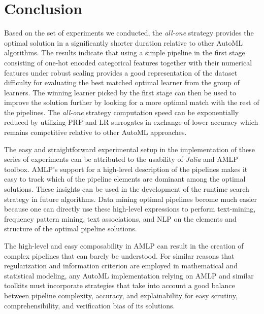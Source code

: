 \documentclass{juliacon}
\begin{document}
\section{Conclusion}

Based on the set of experiments we conducted, 
the \emph{all-one} strategy provides the optimal solution in 
a significantly shorter duration relative to other
AutoML algorithms. The results indicate that using a simple pipeline
in the first stage consisting of one-hot encoded categorical 
features together with their numerical features
under robust scaling provides a good representation of the dataset difficulty
for evaluating the best matched optimal learner from the group of learners.
The winning learner picked by the first stage can then be used to improve the
solution further by looking for a more optimal match with the rest of the
pipelines. The \emph{all-one} strategy computation speed can be exponentially 
reduced by utilizing PRP and LR surrogates in exchange of lower accuracy
which remains competitive relative to other AutoML approaches.

\vskip 6pt

The easy and straightforward experimental setup in the implementation of these
series of experiments can be attributed to the 
usability of \emph{Julia} and AMLP toolbox.
AMLP's support for a high-level description of the pipelines
makes it easy to track which of the
pipeline elements are dominant among the optimal solutions. These insights can
be used in the development of the runtime search strategy in future algorithms.
Data mining optimal pipelines become much easier because one can
directly use these high-level expressions to perform text-mining,
frequency pattern mining, text associations,
and NLP on the elements and structure of the optimal pipeline solutions.

\vskip 6pt

The high-level and easy composability in AMLP can result in the creation of
complex pipelines that can barely be understood. For similar reasons that
regularization and information criterion are employed in mathematical and
statistical modeling, any AutoML implementation relying on AMLP and similar
toolkits must incorporate strategies that take into account a good balance
between pipeline complexity, accuracy, and explainability for easy scrutiny,
comprehensibility, and verification bias of its solutions.

\vskip 6pt
\end{document}
